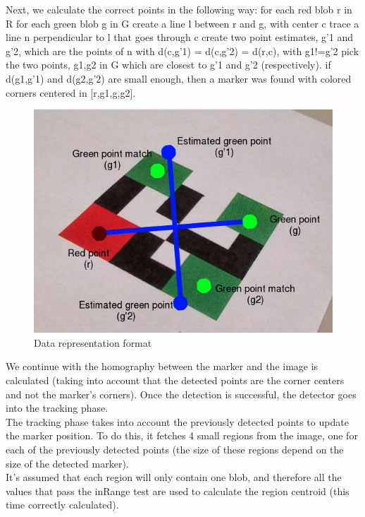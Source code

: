 \documentclass[DIV=calc, paper=a4, fontsize=11pt, twocolumn]{scrartcl}	 %
\begin{document}
Next, we calculate the correct points in the following way:
for each red blob r in R
for each green blob g in G
create a line l between r and g, with center c
trace a line n perpendicular to l that goes through c
create two point estimates, g’1 and g’2, which are the points of n with d(c,g’1) = d(c,g’2) = d(r,c), with g1!=g’2
pick the two points, g1,g2 in G which are closest to g’1 and g’2 (respectively).
if d(g1,g’1) and d(g2,g’2) are small enough, then a marker was found with colored corners centered in [r,g1,g,g2].\\

\begin{figure}[!h]
    \centering
    \includegraphics[width=0.9\columnwidth]{marker.png}
    \caption{Data representation format}
    \label{fig:marker3}
\end{figure}

We continue with the homography between the marker and the image is calculated (taking into account that the detected points are the corner centers and not the marker's corners).
Once the detection is successful, the detector goes into the tracking phase.\\


The tracking phase takes into account the previously detected points to update the marker position. To do this, it fetches 4 small regions from the image, one for each of the previously detected points (the size of these regions depend on the size of the detected marker).\\


It's assumed that each region will only contain one blob, and therefore all the values that pass the inRange test are used to calculate the region centroid (this time correctly calculated).\\
\end{document}
